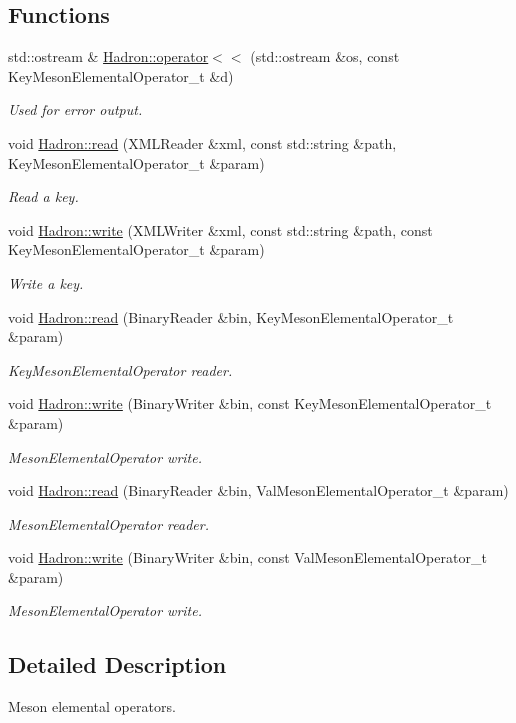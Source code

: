 \subsection*{Functions}
\begin{DoxyCompactItemize}
\item 
std\+::ostream \& \mbox{\hyperlink{namespaceHadron_a24d0db7f972f8d517641ad9235bfa33c}{Hadron\+::operator$<$$<$}} (std\+::ostream \&os, const Key\+Meson\+Elemental\+Operator\+\_\+t \&d)
\begin{DoxyCompactList}\small\item\em Used for error output. \end{DoxyCompactList}\item 
void \mbox{\hyperlink{namespaceHadron_adde6149254919751c9f0e1b2b12c4d17}{Hadron\+::read}} (X\+M\+L\+Reader \&xml, const std\+::string \&path, Key\+Meson\+Elemental\+Operator\+\_\+t \&param)
\begin{DoxyCompactList}\small\item\em Read a key. \end{DoxyCompactList}\item 
void \mbox{\hyperlink{namespaceHadron_ad432e121844a2fa83775051e43481116}{Hadron\+::write}} (X\+M\+L\+Writer \&xml, const std\+::string \&path, const Key\+Meson\+Elemental\+Operator\+\_\+t \&param)
\begin{DoxyCompactList}\small\item\em Write a key. \end{DoxyCompactList}\item 
void \mbox{\hyperlink{namespaceHadron_ae6acb258c409e20fdd2a36b3266138bc}{Hadron\+::read}} (Binary\+Reader \&bin, Key\+Meson\+Elemental\+Operator\+\_\+t \&param)
\begin{DoxyCompactList}\small\item\em Key\+Meson\+Elemental\+Operator reader. \end{DoxyCompactList}\item 
void \mbox{\hyperlink{namespaceHadron_abb7bfe7ab47ecc24ac8d489bdaf701d2}{Hadron\+::write}} (Binary\+Writer \&bin, const Key\+Meson\+Elemental\+Operator\+\_\+t \&param)
\begin{DoxyCompactList}\small\item\em Meson\+Elemental\+Operator write. \end{DoxyCompactList}\item 
void \mbox{\hyperlink{namespaceHadron_ae34c01603f5e8f9246374fddfaa8e062}{Hadron\+::read}} (Binary\+Reader \&bin, Val\+Meson\+Elemental\+Operator\+\_\+t \&param)
\begin{DoxyCompactList}\small\item\em Meson\+Elemental\+Operator reader. \end{DoxyCompactList}\item 
void \mbox{\hyperlink{namespaceHadron_af16b79349f97386286cfc1cd9dfb73f0}{Hadron\+::write}} (Binary\+Writer \&bin, const Val\+Meson\+Elemental\+Operator\+\_\+t \&param)
\begin{DoxyCompactList}\small\item\em Meson\+Elemental\+Operator write. \end{DoxyCompactList}\end{DoxyCompactItemize}


\subsection{Detailed Description}
Meson elemental operators. 

